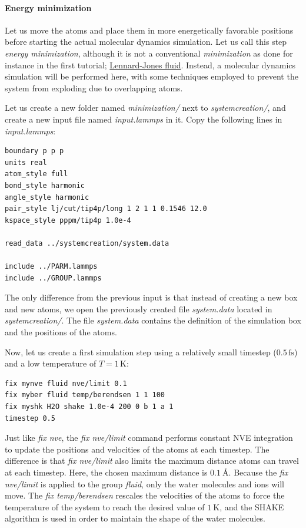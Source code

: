 \documentclass[9pt,tutorial]{livecoms}
\begin{document}
\paragraph{Energy minimization}
Let us move the atoms and place them in more energetically favorable positions before starting the actual molecular dynamics simulation. Let us call this step \textit{energy minimization}, although it is not a conventional \textit{minimization} as done for instance in the first tutorial; \hyperref[lennard-jones-label]{Lennard-Jones fluid}. Instead, a molecular dynamics simulation will be performed here, with some techniques employed to prevent the system from exploding due to overlapping atoms.

Let us create a new folder named \textit{minimization/} next to \textit{systemcreation/}, and create a new input file named \textit{input.lammps} in it. Copy the following lines in \textit{input.lammps}:
{\normalsize \begin{verbatim}
boundary p p p
units real
atom_style full
bond_style harmonic
angle_style harmonic
pair_style lj/cut/tip4p/long 1 2 1 1 0.1546 12.0
kspace_style pppm/tip4p 1.0e-4

read_data ../systemcreation/system.data

include ../PARM.lammps
include ../GROUP.lammps
\end{verbatim}}
The only difference from the previous input is that instead of creating a new box and new atoms, we open the previously created file \textit{system.data} located in \textit{systemcreation/}. The file \textit{system.data} contains the definition of the simulation box and the positions of the atoms.

Now, let us create a first simulation step using a relatively small 
timestep ($0.5\,\text{fs}$) and a low temperature of $T = 1\,\text{K}$:
{\normalsize \begin{verbatim}
fix mynve fluid nve/limit 0.1
fix myber fluid temp/berendsen 1 1 100
fix myshk H2O shake 1.0e-4 200 0 b 1 a 1
timestep 0.5
\end{verbatim}}
Just like \textit{fix nve}, the \textit{fix nve/limit} command performs constant NVE integration to update the positions and velocities of the atoms at each timestep. The difference is that \textit{fix nve/limit} also limits the maximum distance atoms can travel at each timestep. Here, the chosen maximum distance is $0.1~\text{Å}$. Because the \textit{fix nve/limit} is applied to the group \textit{fluid}, only the water molecules and ions will move. The \textit{fix temp/berendsen} rescales the velocities of the atoms to force the temperature of the system to reach the desired value of $1~\text{K}$, and the SHAKE algorithm is used in order to maintain the shape of the water molecules.
\end{document}
